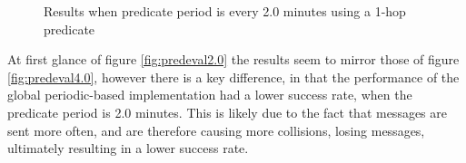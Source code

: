 \begin{figure}[H]
\centering
{}

\caption{Results when predicate period is every 2.0 minutes using a 1-hop predicate}
\label{fig:predeval2.0}
\end{figure}

At first glance of figure \autoref{fig:predeval2.0} the results seem to mirror those of figure \autoref{fig:predeval4.0}, however there is a key difference, in that the performance of the global periodic-based implementation had a lower success rate, when the predicate period is 2.0 minutes. This is likely due to the fact that messages are sent more often, and are therefore causing more collisions, losing messages, ultimately resulting in a lower success rate. 


